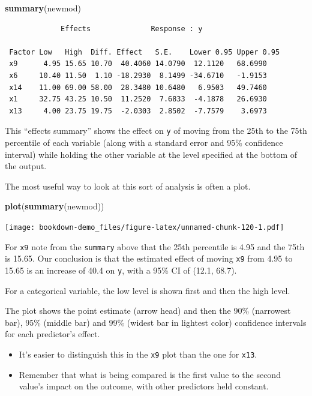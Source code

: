 \documentclass[]{book}
\newenvironment{Shaded}{\begin{snugshade}}{\end{snugshade}}
\newcommand{\KeywordTok}[1]{\textcolor[rgb]{0.13,0.29,0.53}{\textbf{#1}}}
\newcommand{\NormalTok}[1]{#1}
\providecommand{\tightlist}{%
  \setlength{\itemsep}{0pt}\setlength{\parskip}{0pt}}
\theoremstyle{definition}
\theoremstyle{definition}
\theoremstyle{definition}
\theoremstyle{remark}
\begin{document}
\begin{Shaded}
\begin{Highlighting}[]
\KeywordTok{summary}\NormalTok{(newmod)}
\end{Highlighting}
\end{Shaded}

\begin{verbatim}
             Effects              Response : y 

 Factor Low   High  Diff. Effect   S.E.    Lower 0.95 Upper 0.95
 x9      4.95 15.65 10.70  40.4060 14.0790  12.1120   68.6990   
 x6     10.40 11.50  1.10 -18.2930  8.1499 -34.6710   -1.9153   
 x14    11.00 69.00 58.00  28.3480 10.6480   6.9503   49.7460   
 x1     32.75 43.25 10.50  11.2520  7.6833  -4.1878   26.6930   
 x13     4.00 23.75 19.75  -2.0303  2.8502  -7.7579    3.6973   
\end{verbatim}

This ``effects summary'' shows the effect on \texttt{y} of moving from
the 25th to the 75th percentile of each variable (along with a standard
error and 95\% confidence interval) while holding the other variable at
the level specified at the bottom of the output.

The most useful way to look at this sort of analysis is often a plot.

\begin{Shaded}
\begin{Highlighting}[]
\KeywordTok{plot}\NormalTok{(}\KeywordTok{summary}\NormalTok{(newmod))}
\end{Highlighting}
\end{Shaded}

\texttt{[image: bookdown-demo\_files/figure-latex/unnamed-chunk-120-1.pdf]}

For \texttt{x9} note from the \texttt{summary} above that the 25th
percentile is 4.95 and the 75th is 15.65. Our conclusion is that the
estimated effect of moving \texttt{x9} from 4.95 to 15.65 is an increase
of 40.4 on \texttt{y}, with a 95\% CI of (12.1, 68.7).

For a categorical variable, the low level is shown first and then the
high level.

The plot shows the point estimate (arrow head) and then the 90\%
(narrowest bar), 95\% (middle bar) and 99\% (widest bar in lightest
color) confidence intervals for each predictor's effect.

\begin{itemize}
\tightlist
\item
  It's easier to distinguish this in the \texttt{x9} plot than the one
  for \texttt{x13}.
\item
  Remember that what is being compared is the first value to the second
  value's impact on the outcome, with other predictors held constant.
\end{itemize}
\end{document}

